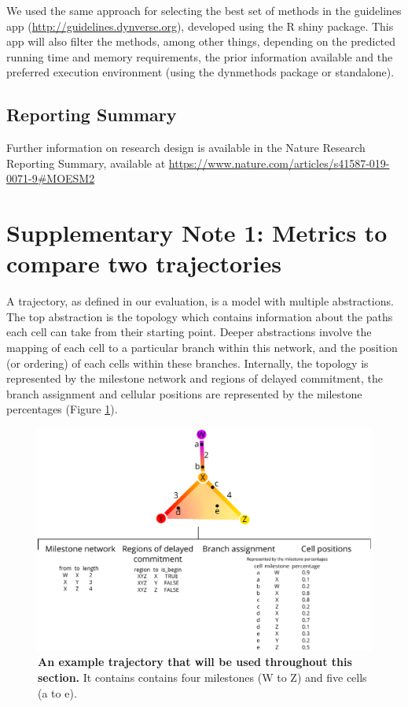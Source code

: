 We used the same approach for selecting the best set of methods in the guidelines app (\href{http://guidelines.dynverse.org}{http://guidelines.dynverse.org}), developed using the R shiny package. This app will also filter the methods, among other things, depending on the predicted running time and memory requirements, the prior information available and the preferred execution environment (using the dynmethods package or standalone).

\subsection{Reporting Summary}

Further information on research design is available in the Nature Research Reporting Summary, available at \href{https://www.nature.com/articles/s41587-019-0071-9\#MOESM2}{https://www.nature.com/articles/s41587-019-0071-9\#MOESM2}

\section{Supplementary Note 1: Metrics to compare two trajectories}

A trajectory, as defined in our evaluation, is a model with multiple abstractions. The top abstraction is the topology which contains information about the paths each cell can take from their starting point. Deeper abstractions involve the mapping of each cell to a particular branch within this network, and the position (or ordering) of each cells within these branches. Internally, the topology is represented by the milestone network and regions of delayed commitment, the branch assignment and cellular positions are represented by the milestone percentages (Figure \ref{fig:snote1fig_1}).

\begin{figure}
	\centering\includegraphics[width=\linewidth]{fig/dynbenchmark/snote1fig_1.pdf}
	\caption{
		\textbf{An example trajectory that will be used throughout this section.}
		It contains contains four milestones (W to Z) and five cells (a to e).
	}
	\label{fig:snote1fig_1}
\end{figure}

